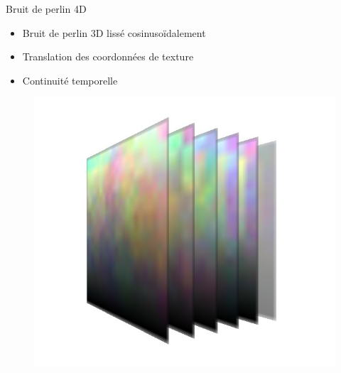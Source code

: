 \documentclass{beamer}
\begin{document}
\begin{frame}{Bruit de perlin 4D}
  \begin{itemize}
  \item Bruit de perlin 3D lissé cosinusoïdalement
  \item Translation des coordonnées de texture
  \item Continuité temporelle
  \end{itemize} 
    \begin{figure}[!h]
      \centering\includegraphics[scale=0.2]{Perlin3D.jpg}
    \end{figure}
\end{frame}
\end{document}
